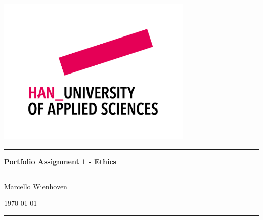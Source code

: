 \documentclass[11pt, twoside]{article}
\numberwithin{equation}{section}
\renewcommand{\baselinestretch}{1}\normalsize
\begin{document}
\thispagestyle{empty}  %
\pagestyle{fancy}      %

\renewcommand{\baselinestretch}{1}\normalsize

\fancyhf{}  %
\renewcommand{\footrulewidth}{1.1pt}  %
\renewcommand{\headrulewidth}{0pt}    %
\fancyfoot[LE]{\thepage}  %
\fancyfoot[RO]{\thepage}  %
\fancyfoot[LO]{\leftmark}   %
\fancyfoot[RE]{\leftmark}   %

\begin{titlepage}
    \centering
    \includegraphics[width=0.7\textwidth]{HAN-merkteken-descriptor.png}
    \vspace{1cm} %
    \hrule
    \vspace{0.5cm}
    {\Huge \bfseries Portfolio Assignment 1 - Ethics \par}
    \vspace{0.5cm}
    \hrule
    \vspace{0.5cm}
    {\LARGE Marcello Wienhoven \par}
    \vspace{0.5cm}
    {\LARGE \today \par}
    \vspace{0.5cm}
    \hrule
    
\end{titlepage}
\end{document}
